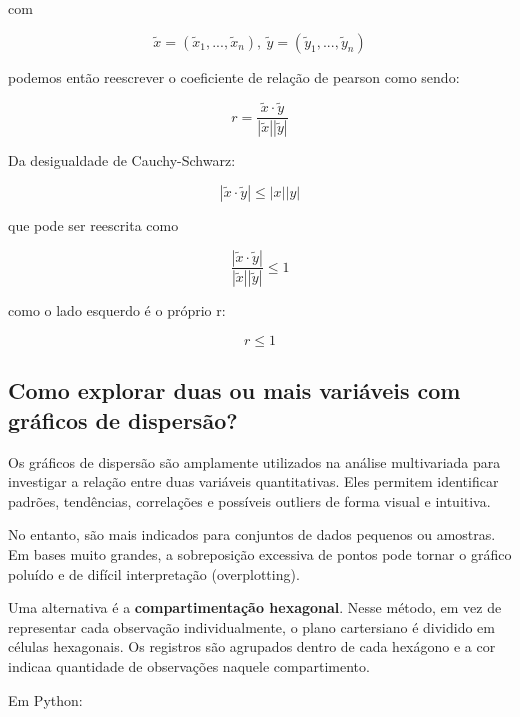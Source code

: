 \documentclass{article}
\begin{document}
com

\begin{equation*}
    \tilde{x} = (\tilde{x}_1, ..., \tilde{x}_n), \ \tilde{y} = (\tilde{y}_1, ..., \tilde{y}_n)
\end{equation*}

podemos então reescrever o coeficiente de relação de pearson como sendo:

\begin{equation*}
    r = \frac{\tilde{x}\cdot \tilde{y}}{|\tilde{x}||\tilde{y}|}
\end{equation*}

Da desigualdade de Cauchy-Schwarz:

\begin{equation*}
    |\tilde{x} \cdot \tilde{y}| \leq |x||y|
\end{equation*}

que pode ser reescrita como

\begin{equation*}
    \frac{|\tilde{x}\cdot \tilde{y}|}{|\tilde{x}||\tilde{y}|} \leq 1
\end{equation*}

como o lado esquerdo é o próprio r:

\begin{equation*}
    r \leq 1
\end{equation*}

\subsection{Como explorar duas ou mais variáveis com gráficos de dispersão?}

Os gráficos de dispersão são amplamente utilizados na análise multivariada para investigar a relação entre duas variáveis quantitativas. Eles permitem identificar padrões, tendências, correlações e possíveis outliers de forma visual e intuitiva.

No entanto, são mais indicados para conjuntos de dados pequenos ou amostras. Em bases muito grandes, a sobreposição excessiva de pontos pode tornar o gráfico poluído e de difícil interpretação (overplotting).

Uma alternativa é a \textbf{compartimentação hexagonal}. Nesse método, em vez de representar cada observação individualmente, o plano cartersiano é dividido em células hexagonais. Os registros são agrupados dentro de cada hexágono e a cor indicaa quantidade de observações naquele compartimento.

Em Python:
\end{document}
